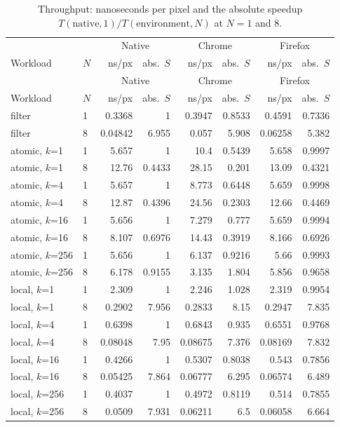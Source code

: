 {\small
\begin{longtable}{llrrrrrr}
\caption{Throughput: nanoseconds per pixel and the absolute speedup $T(\mathrm{native},1)/T(\mathrm{environment},N)$ at $N=1$ and 8.}\label{tab:throughput} \\
\toprule
 &  & \multicolumn{2}{c}{Native} & \multicolumn{2}{c}{Chrome} & \multicolumn{2}{c}{Firefox} \\
Workload & $N$ & ns/px & abs.\ $S$ & ns/px & abs.\ $S$ & ns/px & abs.\ $S$ \\
\midrule
\endfirsthead
\toprule
 &  & \multicolumn{2}{c}{Native} & \multicolumn{2}{c}{Chrome} & \multicolumn{2}{c}{Firefox} \\
Workload & $N$ & ns/px & abs.\ $S$ & ns/px & abs.\ $S$ & ns/px & abs.\ $S$ \\
\midrule
\endhead
\bottomrule
\endfoot
filter & 1 & 0.3368 & 1 & 0.3947 & 0.8533 & 0.4591 & 0.7336 \\
filter & 8 & 0.04842 & 6.955 & 0.057 & 5.908 & 0.06258 & 5.382 \\
\midrule
atomic, $k$=1 & 1 & 5.657 & 1 & 10.4 & 0.5439 & 5.658 & 0.9997 \\
atomic, $k$=1 & 8 & 12.76 & 0.4433 & 28.15 & 0.201 & 13.09 & 0.4321 \\
\midrule
atomic, $k$=4 & 1 & 5.657 & 1 & 8.773 & 0.6448 & 5.659 & 0.9998 \\
atomic, $k$=4 & 8 & 12.87 & 0.4396 & 24.56 & 0.2303 & 12.66 & 0.4469 \\
\midrule
atomic, $k$=16 & 1 & 5.656 & 1 & 7.279 & 0.777 & 5.659 & 0.9994 \\
atomic, $k$=16 & 8 & 8.107 & 0.6976 & 14.43 & 0.3919 & 8.166 & 0.6926 \\
\midrule
atomic, $k$=256 & 1 & 5.656 & 1 & 6.137 & 0.9216 & 5.66 & 0.9993 \\
atomic, $k$=256 & 8 & 6.178 & 0.9155 & 3.135 & 1.804 & 5.856 & 0.9658 \\
\midrule
local, $k$=1 & 1 & 2.309 & 1 & 2.246 & 1.028 & 2.319 & 0.9954 \\
local, $k$=1 & 8 & 0.2902 & 7.956 & 0.2833 & 8.15 & 0.2947 & 7.835 \\
\midrule
local, $k$=4 & 1 & 0.6398 & 1 & 0.6843 & 0.935 & 0.6551 & 0.9768 \\
local, $k$=4 & 8 & 0.08048 & 7.95 & 0.08675 & 7.376 & 0.08169 & 7.832 \\
\midrule
local, $k$=16 & 1 & 0.4266 & 1 & 0.5307 & 0.8038 & 0.543 & 0.7856 \\
local, $k$=16 & 8 & 0.05425 & 7.864 & 0.06777 & 6.295 & 0.06574 & 6.489 \\
\midrule
local, $k$=256 & 1 & 0.4037 & 1 & 0.4972 & 0.8119 & 0.514 & 0.7855 \\
local, $k$=256 & 8 & 0.0509 & 7.931 & 0.06211 & 6.5 & 0.06058 & 6.664 \\
\end{longtable}
}
